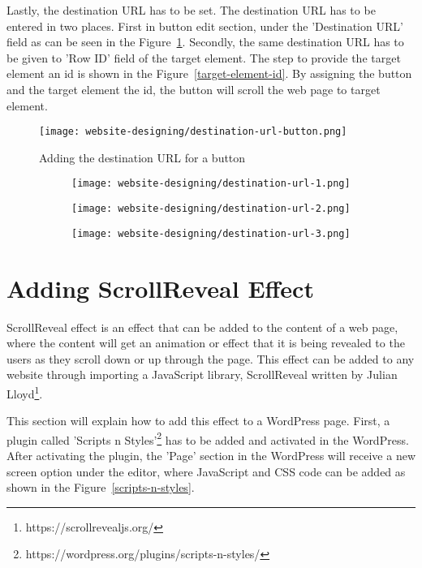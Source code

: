 Lastly, the destination URL has to be set. The destination URL has to be entered in two places. First in button edit section, under the 'Destination URL' field as can be seen in the Figure~\ref{destination-url-button}.  Secondly, the same destination URL has to be given to 'Row ID' field of the target element. The step to provide the target element an id is shown in the Figure~\ref{target-element-id}. By assigning the button and the target element the id, the button will scroll the web page to target element.

\begin{figure}[h]
\centering
\caption{Adding the destination URL for a button}
\label{destination-url-button}
\texttt{[image: website-designing/destination-url-button.png]}
\end{figure}

\begin{figure}[h]
\caption{Adding Row Id to the Target Element}
\label{target-element-id}
\centering
	\begin{subfigure}{.49\linewidth}
	\centering
	\texttt{[image: website-designing/destination-url-1.png]}
	\end{subfigure}
	\begin{subfigure}{0.49\linewidth}
	\centering
	\texttt{[image: website-designing/destination-url-2.png]}
	\end{subfigure}
	\begin{subfigure}{0.49\linewidth}
	\centering
	\texttt{[image: website-designing/destination-url-3.png]}
	\end{subfigure}
\end{figure}

\section{Adding ScrollReveal Effect}
ScrollReveal effect is an effect that can be added to the content of a web page, where the content will get an animation or effect that it is being revealed to the users as they scroll down or up through the page. This effect can be added to any website through importing a JavaScript library, ScrollReveal written by Julian Lloyd\footnote{https://scrollrevealjs.org/}.

This section will explain how to add this effect to a WordPress page. First, a plugin called 'Scripts n Styles'\footnote{https://wordpress.org/plugins/scripts-n-styles/} has to be added and activated in the WordPress. After activating the plugin, the 'Page' section in the WordPress will receive a new screen option under the editor, where JavaScript and CSS code can be added as shown in the Figure~\ref{scripts-n-styles}.

